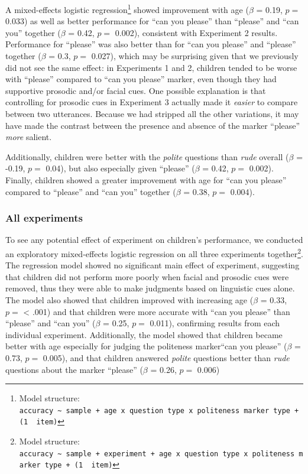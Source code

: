 \documentclass[10pt, letterpaper]{article}
\begin{document}
A mixed-effects logistic regression\footnote{Model structure:
  \texttt{accuracy\ \textasciitilde{}\ sample\ +\ age\ x\ question\ type\ x\ politeness\ marker\ type\ +\ (1\ \textbar{}\ item)}}
showed improvement with age (\(\beta\) = 0.19, \(p =\) 0.033) as well as
better performance for ``can you please'' than ``please'' and ``can
you'' together (\(\beta\) = 0.42, \(p =\) 0.002), consistent with
Experiment 2 results. Performance for ``please'' was also better than
for ``can you please'' and ``please'' together (\(\beta\) = 0.3, \(p =\)
0.027), which may be surprising given that we previously did not see the
same effect: in Experiments 1 and 2, children tended to be worse with
``please'' compared to ``can you please'' marker, even though they had
supportive prosodic and/or facial cues. One possible explanation is that
controlling for prosodic cues in Experiment 3 actually made it
\emph{easier} to compare between two utterances. Because we had stripped
all the other variations, it may have made the contrast between the
presence and absence of the marker ``please'' \emph{more} salient.

Additionally, children were better with the \emph{polite} questions than
\emph{rude} overall (\(\beta\) = -0.19, \(p =\) 0.04), but also
especially given ``please'' (\(\beta\) = 0.42, \(p =\) 0.002). Finally,
children showed a greater improvement with age for ``can you please''
compared to ``please'' and ``can you'' together (\(\beta\) = 0.38,
\(p =\) 0.004).

\subsubsection{All experiments}\label{all-experiments}

To see any potential effect of experiment on children's performance, we
conducted an exploratory mixed-effects logistic regression on all three
experiments together\footnote{Model structure:
  \texttt{accuracy\ \textasciitilde{}\ sample\ +\ experiment\ +\ age\ x\ question\ type\ x\ politeness\ marker\ type\ +\ (1\ \textbar{}\ item)}}.
The regression model showed no significant main effect of experiment,
suggesting that children did not perform more poorly when facial and
prosodic cues were removed, thus they were able to make judgments based
on linguistic cues alone. The model also showed that children improved
with increasing age (\(\beta\) = 0.33, \(p =\) \textless{} .001) and
that children were more accurate with ``can you please'' than ``please''
and ``can you'' (\(\beta\) = 0.25, \(p =\) 0.011), confirming results
from each individual experiment. Additionally, the model showed that
children became better with age especially for judging the politeness
marker``can you please'' (\(\beta\) = 0.73, \(p =\) 0.005), and that
children answered \emph{polite} questions better than \emph{rude}
questions about the marker ``please'' (\(\beta\) = 0.26, \(p =\) 0.006)
\end{document}
